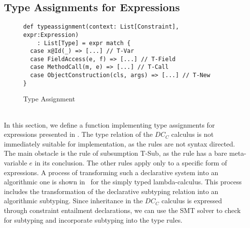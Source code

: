 \subsection{Type Assignments for Expressions}
\label{sec:typeass}
%
\begin{figure}[h]
\begin{lstlisting}
def typeassignment(context: List[Constraint], expr:Expression)
    : List[Type] = expr match {
  case x@Id(_) => [...] // T-Var
  case FieldAccess(e, f) => [...] // T-Field
  case MethodCall(m, e) => [...] // T-Call
  case ObjectConstruction(cls, args) => [...] // T-New
}
\end{lstlisting}
\caption{Type Assignment}
\label{fig:scala-typeass}
\end{figure}\quad\\
%
In this section, we define a function 
implementing type assignments for expressions presented in .
The type relation of the $DC_C$ calculus is not immediately suitable for implementation,
as the rules are not syntax directed.
The main obstacle is the rule of subsumption T-Sub,
as the rule has a bare meta-variable $e$ in its conclusion.
The other rules apply only to a specific form of expressions.
A process of transforming such a declarative system into an algorithmic one
is shown in~\cite{tpl} for the simply typed lambda-calculus.
This process includes the transformation of the declarative subtyping relation
into an algorithmic subtyping.
Since inheritance in the $DC_C$ calculus is expressed
through constraint entailment declarations,
we can use the SMT solver to check for subtyping
and incorporate subtyping into the type rules.

